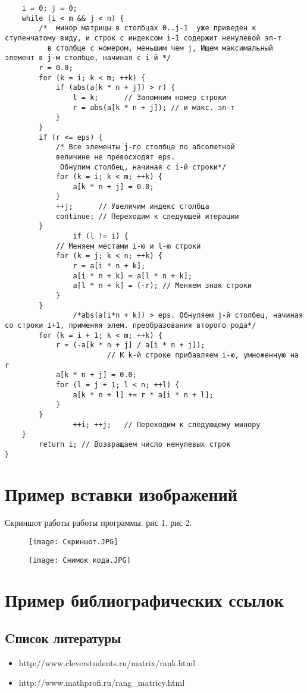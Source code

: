 \documentclass[12pt,a4paper]{scrartcl}
\begin{document}
\begin{verbatim}
    i = 0; j = 0;
    while (i < m && j < n) {
        /*  минор матрицы в столбцах 0..j-1  уже приведен к ступенчатому виду, и строк с индексом i-1 содержит ненулевой эл-т
          в столбце с номером, меньшим чем j, Ищем максимальный элемент в j-м столбце, начиная с i-й */
        r = 0.0;
        for (k = i; k < m; ++k) {
            if (abs(a[k * n + j]) > r) {
                l = k;      // Запомним номер строки
                r = abs(a[k * n + j]); // и макс. эл-т
            }
        }
        if (r <= eps) {
            /* Все элементы j-го столбца по абсолютной
            величине не превосходят eps.
             Обнулим столбец, начиная с i-й строки*/
            for (k = i; k < m; ++k) {
                a[k * n + j] = 0.0;
            }
            ++j;      // Увеличим индекс столбца
            continue; // Переходим к следующей итерации
        }
                if (l != i) {
            // Меняем местами i-ю и l-ю строки
            for (k = j; k < n; ++k) {
                r = a[i * n + k];
                a[i * n + k] = a[l * n + k];
                a[l * n + k] = (-r); // Меняем знак строки
            }
        }
                /*abs(a[i*n + k]) > eps. Обнуляем j-й столбец, начиная со строки i+1, применяя элем. преобразования второго рода*/
        for (k = i + 1; k < m; ++k) {
            r = (-a[k * n + j] / a[i * n + j]);
                        // К k-й строке прибавляем i-ю, умноженную на r
            a[k * n + j] = 0.0;
            for (l = j + 1; l < n; ++l) {
                a[k * n + l] += r * a[i * n + l];
            }
        }
                ++i; ++j;   // Переходим к следующему минору
    }
        return i; // Возвращаем число ненулевых строк
}

\end{verbatim}
\section{Пример вставки изображений}
 Скриншот работы работы программы. рис 1, рис 2.
\begin{figure}[h]
    \centering
    \texttt{[image: Скриншот.JPG]}
    \caption{\label{figl}}
\end{figure}
\begin{figure}[h]
    \centering
    \texttt{[image: Снимок кода.JPG]}
    \caption{\label{figl}}
\end{figure}
\section{Пример библиографических ссылок} 
\subsection{Cписок литературы} 
\begin{itemize}
    \item http://www.cleverstudents.ru/matrix/rank.html
    \item http://www.mathprofi.ru/rang_matricy.html
\end{itemize}
\end{document}
